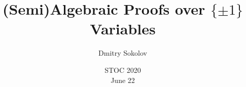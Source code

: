 

\titlegraphic{
    
}


\title[$\{\pm 1\}$ Variables]{
    (Semi)Algebraic Proofs over $\{\pm 1\}$ Variables
}

\author[Sokolov D.]{
    Dmitry Sokolov
}  


\date{STOC 2020\\ June 22}

\newcommand{\SPCR}{\PrSys{S}\text{-}\PrSys{PCR}}
\newcommand{\SSOS}{\PrSys{S}\text{-}\PrSys{SOS}}




    \maketitle

    
    
    

